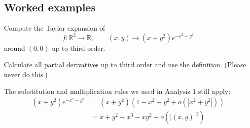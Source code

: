 \subsection{Worked examples}

\begin{exercise}
\label{ex:taylor_explicit_example}
Compute the Taylor expansion of
\[f : \mathbb{R}^2\to\mathbb{R}, \qquad (x,y) \mapsto (x+y^2)e^{-x^2-y^2}\]
around $(0,0)$ up to third order.
\end{exercise}

\begin{exercisesolution}
Calculate all partial derivatives up to third order and use the definition. (Please never do
this.)
\end{exercisesolution}

\begin{exercisesolution}
The substitution and multiplication rules we used in Analysis 1 still apply:
\[
\begin{aligned}
(x+y^2)e^{-x^2-y^2} &= (x+y^2)\left(1 - x^2 - y^2 + o(|x^2+y^2|)\right) \\
&= x + y^2 - x^3 - xy^2 + o\!\left(|(x,y)|^3\right)
\end{aligned}
\]
\end{exercisesolution}

